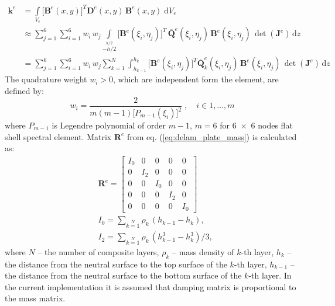 \documentclass[preprint,12pt]{elsarticle}
\newcommand{\ud}{\mathrm{d}}
\renewcommand{\vec}[1]{\mathbf{#1}}
\renewcommand{\bm}[1]{\mathbf{#1}}
\begin{document}
	\begin{equation}
	\begin{split}
	\bm{k}^e &= \int \limits_{V_e} \big[\vec{B}^e\!(x,y)\big]^{\!T} \vec{D}^e \!(x,y)\, \vec{B}^e\!(x,y) \; \ud V_e \\
	& \approx \sum \limits_{j=1}^{6} \sum \limits_{i=1}^{6} w_i\, w_j\! \int \limits_{-h/2}\limits^{h/2} \big[\vec{B}^e\!(\xi_i,\eta_j)\big]^{\!T}\, \bm{\overline Q}^e\!(\xi_i,\eta_j) \, \vec{B}^e\!(\xi_i,\eta_j) \, \det(\vec{J}^e)\, \ud z\\
	&=\sum \limits_{j=1}^{6} \sum \limits_{i=1}^{6} w_i\, w_j \sum \limits_{k=1}^{N} \int_{h_{k-1}}^{h_k} \big[\vec{B}^e\!(\xi_i,\eta_j)\big]^{\!T} \bm{\overline Q}_k^e\!(\xi_i,\eta_j) \, \vec{B}^e\!(\xi_i,\eta_j) \, \det(\vec{J}^e)\, \ud z \label{eq:dealm_plate_stiffness}
	\end{split}
	\end{equation} 
	The quadrature weight $w_i > 0$, which are independent form the element, are defined by:
	\begin{equation}
	w_i = \frac{2}{m(m-1)\big[ P_{m-1}\!(\xi_i) \big]^2}\; , \quad i \in 1,\ldots, m \label{eq:weights}
	\end{equation}
	where $P_{m-1}$ is Legendre polynomial of order $m-1$, $m=6$ for 6~$\times$~6 nodes flat shell spectral element.
	Matrix $\bm{R}^e$ from eq. (\ref{eq:delam_plate_mass}) is calculated as:
	\begin{equation}
	\begin{split}
	&\bm{R}^e = \left[\begin{array}{ccccc} I_0 & 0&0&0&0 \\ 0& I_2&0&0&0 \\0&0&I_0&0&0\\0&0&0&I_2&0\\ 0&0&0&0&I_0 \end{array}\right]\\
	&I_0 =  \sum \limits_{k=1}\limits^{N} \rho_k \,(h_{k-1} - h_k),\\ 
	& I_2 =  \sum \limits_{k=1}\limits^{N} \rho_k \,(h_{k-1}^3 - h_k^3)/3,
	\label{eq:delam_plate_mass_dens}
	\end{split}
	\end{equation}
	where $N$ -- the number of composite layers, $\rho_k$ -- mass density of $k$-th layer, $h_k$ -- the distance from the neutral surface to the top surface of the $k$-th layer, $h_{k-1}$ -- the distance from the neutral surface to the bottom surface of the $k$-th layer.
	In the current implementation it is assumed that damping matrix is proportional to the mass matrix.
\end{document}
